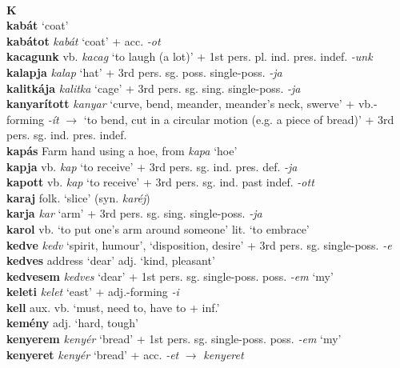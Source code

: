 \documentclass[11pt]{article}
\begin{document}
\ \\
\noindent \textbf{\large K} \\
\textbf{kabát} `coat' \\
\textbf{kabátot} \emph{kabát} `coat' + acc. \emph{-ot} \\
\textbf{kacagunk} vb. \emph{kacag} `to laugh (a lot)' + 1st
pers. pl. ind. pres. indef. \emph{-unk} \\
\textbf{kalapja} \emph{kalap} `hat' + 3rd
pers. sg. poss. single\hyp{}poss. \emph{-ja} \\
\textbf{kalitkája} \emph{kalitka} `cage' + 3rd
pers. sg. sing. single\hyp{}poss. \emph{-ja} \\
\textbf{kanyarított} \emph{kanyar} `curve, bend, meander, meander's
neck, swerve' + vb.\hyp{}forming \emph{-ít}
$\rightarrow$ `to bend, cut in a circular motion (e.g. a piece of
bread)' + 3rd pers. sg. ind. pres. indef. \\
\textbf{kapás} Farm hand using a hoe, from \emph{kapa} `hoe' \\
\textbf{kapja} vb. \emph{kap} `to receive' + 3rd
pers. sg. ind. pres. def. \emph{-ja} \\
\textbf{kapott} vb. \emph{kap} `to receive' + 3rd
pers. sg. ind. past indef. \emph{-ott} \\
\textbf{karaj} folk. `slice' (syn. \emph{karéj}) \\
\textbf{karja} \emph{kar} `arm' + 3rd
pers. sg. sing. single\hyp{}poss. \emph{-ja} \\
\textbf{karol} vb. `to put one's arm around
someone' \textbar\textbar{} lit. `to embrace' \\
\textbf{kedve} \emph{kedv} `spirit, humour', `disposition, desire' +
3rd pers. sg. single\hyp{}poss. \emph{-e} \\
\textbf{kedves} address `dear' \textbar\textbar{} adj. `kind, pleasant' \\
\textbf{kedvesem} \emph{kedves} `dear' + 1st
pers. sg. single\hyp{}poss. poss. \emph{-em} `my' \\
\textbf{keleti} \emph{kelet} `east' + adj.\hyp{}forming \emph{-i} \\
\textbf{kell} aux. vb. `must, need to, have to + inf.' \\
\textbf{kemény} adj. `hard, tough' \\
\textbf{kenyerem} \emph{kenyér} `bread' + 1st
pers. sg. single\hyp{}poss. poss. \emph{-em} `my' \\
\textbf{kenyeret} \emph{kenyér} `bread' + acc. \emph{-et}
$\rightarrow$ \emph{kenyeret} \\
\end{document}
